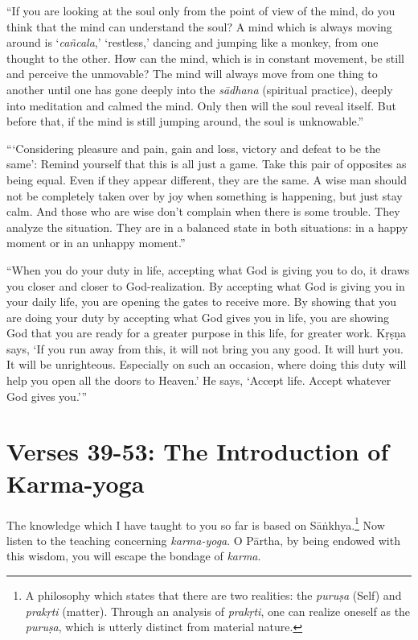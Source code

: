 \enquote{If you are looking at the soul only from the point of view of the mind, do you think that the mind can understand the soul? A mind which is always moving around is \enquote{\textit{cañcala},} \enquote{restless,} dancing and jumping like a monkey, from one thought to the other. How can the mind, which is in constant movement, be still and perceive the unmovable? The mind will always move from one thing to another until one has gone deeply into the \textit{sādhana} (spiritual practice), deeply into meditation and calmed the mind. Only then will the soul reveal itself. But before that, if the mind is still jumping around, the soul is unknowable.}

\enquote{\enquote{Considering pleasure and pain, gain and loss, victory and defeat to be the same}: Remind yourself that this is all just a game. Take this pair of opposites as being equal. Even if they appear different, they are the same. A wise man should not be completely taken over by joy when something is happening, but just stay calm. And those who are wise don’t complain when there is some trouble. They analyze the situation. They are in a balanced state in both situations: in a happy moment or in an unhappy moment.}

\enquote{When you do your duty in life, accepting what God is giving you to do, it draws you closer and closer to God-realization. By accepting what God is giving you in your daily life, you are opening the gates to receive more. By showing that you are doing your duty by accepting what God gives you in life, you are showing God that you are ready for a greater purpose in this life, for greater work. Kṛṣṇa says, \enquote{If you run away from this, it will not bring you any good. It will hurt you. It will be unrighteous. Especially on such an occasion, where doing this duty will help you open all the doors to Heaven.} He says, \enquote{Accept life. Accept whatever God gives you.}}

\section{Verses 39-53: The Introduction of Karma-yoga}\label{sec-verses-39-53-the-introduction-of-karma-yoga}

{The knowledge which I have taught to you so far is based on Sāṅkhya.\footnote{A philosophy which states that there are two realities: the \textit{puruṣa} (Self) and \textit{prakṛti} (matter). Through an analysis of \textit{prakṛti}, one can realize oneself as the \textit{puruṣa}, which is utterly distinct from material nature.} Now listen to the teaching concerning \textit{karma-yoga}. O Pārtha, by being endowed with this wisdom, you will escape the bondage of \textit{karma}.}


